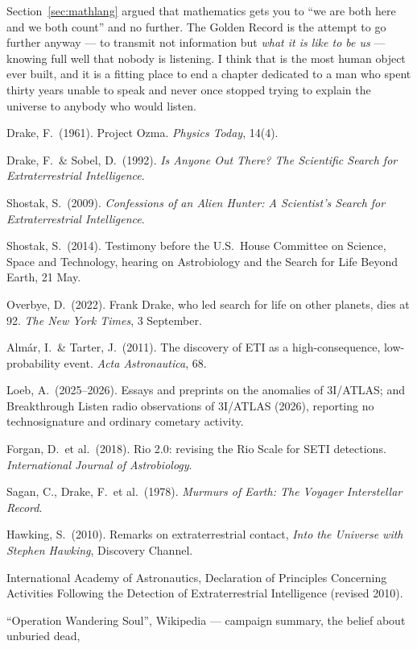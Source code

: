 Section~\ref{sec:mathlang} argued that mathematics gets you to ``we are both here and we both
count'' and no further. The Golden Record is the attempt to go further anyway --- to transmit not
information but \emph{what it is like to be us} --- knowing full well that nobody is listening. I
think that is the most human object ever built, and it is a fitting place to end a chapter dedicated
to a man who spent thirty years unable to speak and never once stopped trying to explain the universe
to anybody who would listen.

\begin{srcnotes}
\item Drake, F.\ (1961). Project Ozma. \emph{Physics Today}, 14(4).
\item Drake, F.\ \& Sobel, D.\ (1992). \emph{Is Anyone Out There? The Scientific Search for
Extraterrestrial Intelligence}.
\item Shostak, S.\ (2009). \emph{Confessions of an Alien Hunter: A Scientist's Search for
Extraterrestrial Intelligence}.
\item Shostak, S.\ (2014). Testimony before the U.S.\ House Committee on Science, Space and
Technology, hearing on Astrobiology and the Search for Life Beyond Earth, 21 May.
\item Overbye, D.\ (2022). Frank Drake, who led search for life on other planets, dies at 92.
\emph{The New York Times}, 3 September.
\item Almár, I.\ \& Tarter, J.\ (2011). The discovery of ETI as a high-consequence, low-probability
event. \emph{Acta Astronautica}, 68.
\item Loeb, A.\ (2025--2026). Essays and preprints on the anomalies of 3I/ATLAS; and
Breakthrough Listen radio observations of 3I/ATLAS (2026), reporting no technosignature and
ordinary cometary activity.
\item Forgan, D.\ et al.\ (2018). Rio 2.0: revising the Rio Scale for SETI detections.
\emph{International Journal of Astrobiology}.
\item Sagan, C., Drake, F.\ et al.\ (1978). \emph{Murmurs of Earth: The Voyager Interstellar
Record}.
\item Hawking, S.\ (2010). Remarks on extraterrestrial contact, \emph{Into the Universe with Stephen
Hawking}, Discovery Channel.
\item International Academy of Astronautics, Declaration of Principles Concerning Activities
Following the Detection of Extraterrestrial Intelligence (revised 2010).
\item ``Operation Wandering Soul'', Wikipedia --- campaign summary, the belief about unburied dead,

\end{srcnotes}
